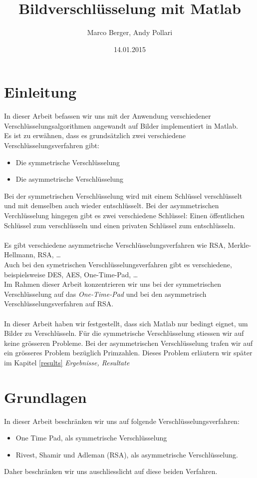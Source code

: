 \documentclass[paper=a4,fontsize=12pt]{scrartcl}
\begin{document}
\title{Bildverschlüsselung mit Matlab}
\author{Marco Berger, Andy Pollari}
\date{14.01.2015}
\maketitle 

\section{Einleitung}
In dieser Arbeit befassen wir uns mit der Anwendung verschiedener Verschlüsselungsalgorithmen
angewandt auf Bilder implementiert in Matlab. \\
Es ist zu erwähnen, dass es grundsätzlich zwei verschiedene Verschlüsselungsverfahren gibt:
\begin{itemize}
  \item Die symmetrische Verschlüsselung 
  \item Die asymmetrische Verschlüsselung 
\end{itemize}
Bei der symmetrischen Verschlüsselung wird mit einem Schlüssel verschlüsselt und mit demselben auch wieder entschlüsselt.
Bei der asymmetrischen Verchlüsselung hingegen gibt es zwei verschiedene Schlüssel: Einen öffentlichen Schlüssel zum verschlüsseln
und einen privaten Schlüssel zum entschlüsseln. \\ \\
Es gibt verschiedene asymmetrische Verschlüsselungsverfahren wie RSA, Merkle-Hellmann, RSA, \ldots \\
Auch bei den symetrischen Verschlüsselungsverfahren gibt es verschiedene, beispielsweise DES, AES, One-Time-Pad, \ldots \\
Im Rahmen dieser Arbeit konzentrieren wir uns bei der symmetrischen Verschlüsselung auf das \textit{One-Time-Pad} 
und bei den asymmetrisch Verschlüsselungsverfahren auf RSA. \\ \\
In dieser Arbeit haben wir festgestellt, dass sich Matlab nur bedingt eignet, um Bilder zu Verschlüsseln.
Für die symmetrische Verschlüsselung stiessen wir auf keine grösseren Probleme. Bei der asymmetrischen Verschlüsselung
trafen wir auf ein grösseres Problem bezüglich Primzahlen. Dieses Problem erläutern wir später im Kapitel \ref{results} \textit{Ergebnisse, Resultate}

\newpage 
\section{Grundlagen} 
In dieser Arbeit beschränken wir uns auf folgende Verschlüsselungsverfahren:
\begin{itemize}
  \item One Time Pad, als symmetrische Verschlüsselung
  \item Rivest, Shamir und Adleman (RSA), als asymmetrische Verschlüsselung.
\end{itemize} 
Daher beschränken wir uns auschliesslicht auf diese beiden Verfahren. 
\end{document}
